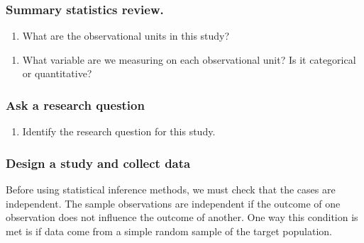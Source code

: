\documentclass[
]{report}
\providecommand{\tightlist}{%
  \setlength{\itemsep}{0pt}\setlength{\parskip}{0pt}}
\begin{document}
\hypertarget{summary-statistics-review.}{%
\subsubsection*{Summary statistics review.}\label{summary-statistics-review.}}

\begin{enumerate}
\def\labelenumi{\arabic{enumi}.}
\tightlist
\item
  What are the observational units in this study?
\end{enumerate}

\vspace{0.3in}

\begin{enumerate}
\def\labelenumi{\arabic{enumi}.}
\setcounter{enumi}{1}
\tightlist
\item
  What variable are we measuring on each observational unit? Is it categorical or quantitative?
\end{enumerate}

\vspace{0.3in}

\hypertarget{ask-a-research-question}{%
\subsubsection*{Ask a research question}\label{ask-a-research-question}}

\begin{enumerate}
\def\labelenumi{\arabic{enumi}.}
\setcounter{enumi}{2}
\tightlist
\item
  Identify the research question for this study.
\end{enumerate}

\vspace{0.6in}

\hypertarget{design-a-study-and-collect-data}{%
\subsubsection*{Design a study and collect data}\label{design-a-study-and-collect-data}}

Before using statistical inference methods, we must check that the cases are independent. The sample observations are independent if the outcome of one observation does not influence the outcome of another. One way this condition is met is if data come from a simple random sample of the target population.
\end{document}
